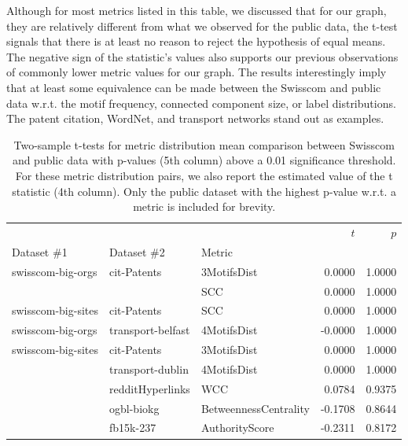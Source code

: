 Although for most metrics listed in this table, we discussed that for our graph, they are relatively different from what we observed for the public data, the t-test signals that there is at least no reason to reject the hypothesis of equal means. The negative sign of the statistic's values also supports our previous observations of commonly lower metric values for our graph. The results interestingly imply that at least some equivalence can be made between the Swisscom and public data w.r.t. the motif frequency, connected component size, or label distributions. The patent citation, WordNet, and transport networks stand out as examples.

\begin{table}[H]
    \centering
    \caption[Two-sample t-tests for metric distribution mean comparison between Swisscom and public data.]{Two-sample t-tests for metric distribution mean comparison between Swisscom and public data with p-values (5th column) above a 0.01 significance threshold. For these metric distribution pairs, we also report the estimated value of the t statistic (4th column). Only the public dataset with the highest p-value w.r.t. a metric is included for brevity.}
    \label{tab:t}
\begin{adjustbox}{width=0.85\columnwidth}
\begin{tabular}{lllrr}
\toprule
                   &                   &          &   $t$ &  $p$ \\
Dataset \#1 & Dataset \#2 & Metric &         &              \\
\midrule
swisscom-big-orgs & cit-Patents & 3MotifsDist &  0.0000 &       1.0000 \\
                   &                   & SCC &  0.0000 &       1.0000 \\
swisscom-big-sites & cit-Patents & SCC &  0.0000 &       1.0000 \\
swisscom-big-orgs & transport-belfast & 4MotifsDist & -0.0000 &       1.0000 \\
swisscom-big-sites & cit-Patents & 3MotifsDist &  0.0000 &       1.0000 \\
                   & transport-dublin & 4MotifsDist &  0.0000 &       1.0000 \\
                   & redditHyperlinks & WCC &  0.0784 &       0.9375 \\
                   & ogbl-biokg & BetweennessCentrality & -0.1708 &       0.8644 \\
                   & fb15k-237 & AuthorityScore & -0.2311 &       0.8172 \\

\end{tabular}
\end{adjustbox}
\end{table}
